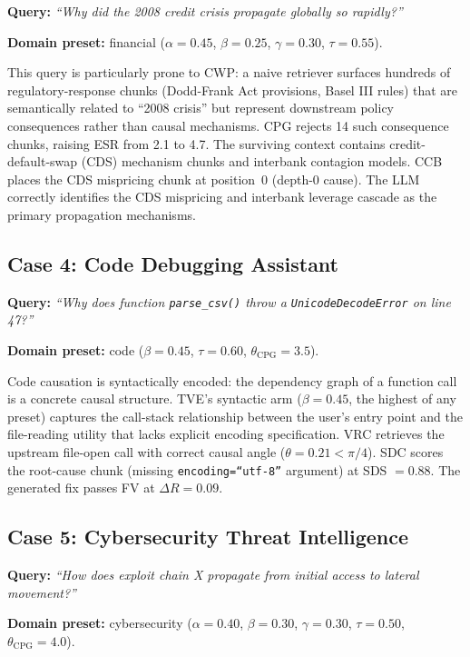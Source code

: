 \documentclass[10pt,twocolumn]{article}
\begin{document}
\noindent\textbf{Query:} \emph{``Why did the 2008 credit crisis propagate globally so rapidly?''}

\noindent\textbf{Domain preset:} financial ($\alpha=0.45$, $\beta=0.25$, $\gamma=0.30$, $\tau=0.55$).

This query is particularly prone to CWP: a naive retriever surfaces hundreds
of regulatory-response chunks (Dodd-Frank Act provisions, Basel III rules)
that are semantically related to ``2008 crisis'' but represent downstream
policy consequences rather than causal mechanisms.  CPG rejects 14 such
consequence chunks, raising ESR from 2.1 to 4.7.  The surviving context
contains credit-default-swap (CDS) mechanism chunks and interbank contagion
models.  CCB places the CDS mispricing chunk at position~0 (depth-0 cause).
The LLM correctly identifies the CDS mispricing and interbank leverage cascade
as the primary propagation mechanisms.

\subsection{Case 4: Code Debugging Assistant}

\noindent\textbf{Query:} \emph{``Why does function \texttt{parse\_csv()} throw a \texttt{UnicodeDecodeError} on line 47?''}

\noindent\textbf{Domain preset:} code ($\beta=0.45$, $\tau=0.60$, $\theta_\text{CPG}=3.5$).

Code causation is syntactically encoded: the dependency graph of a function
call is a concrete causal structure.  TVE's syntactic arm ($\beta=0.45$,
the highest of any preset) captures the call-stack relationship between the
user's entry point and the file-reading utility that lacks explicit encoding
specification.  VRC retrieves the upstream file-open call with correct
causal angle ($\theta = 0.21 < \pi/4$).  SDC scores the root-cause chunk
(missing \texttt{encoding=``utf-8''} argument) at SDS $= 0.88$.  The generated
fix passes FV at $\Delta R = 0.09$.

\subsection{Case 5: Cybersecurity Threat Intelligence}

\noindent\textbf{Query:} \emph{``How does exploit chain X propagate from initial access to lateral movement?''}

\noindent\textbf{Domain preset:} cybersecurity ($\alpha=0.40$, $\beta=0.30$, $\gamma=0.30$, $\tau=0.50$, $\theta_\text{CPG}=4.0$).
\end{document}
